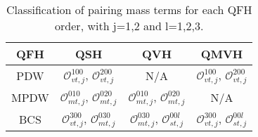 \documentclass[aps,prb,amsmath,amssymb,floatfix,twocolumn]{revtex4}
\begin{document}
\begin{table}[t]
	\def\arraystretch{1.5}
	\begin{tabular}{|c|c|c|c|}
		\hline
		QFH & QSH & QVH & QMVH\\
		\hline
		PDW & $\mathcal{O}_{vt,j}^{100}$, $\mathcal{O}_{vt,j}^{200}$ & N/A & $\mathcal{O}_{vt,j}^{100}$, $\mathcal{O}_{vt,j}^{200}$\\
		\hline
		MPDW & $\mathcal{O}_{mt,j}^{010}$, $\mathcal{O}_{mt,j}^{020}$ & $\mathcal{O}_{mt,j}^{010}$, $\mathcal{O}_{mt,j}^{020}$ & N/A\\
		\hline
		BCS & $\mathcal{O}_{vt,j}^{300}$, $\mathcal{O}_{mt,j}^{030}$ & $\mathcal{O}_{mt,j}^{030}$, $\mathcal{O}_{st,j}^{00l}$ & $\mathcal{O}_{vt,j}^{300}$, $\mathcal{O}_{st,j}^{00l}$\\
		\hline
	\end{tabular}
\caption{Classification of pairing mass terms for each QFH order, with j=1,2 and l=1,2,3.} \label{tab1}
\end{table}
\end{document}
